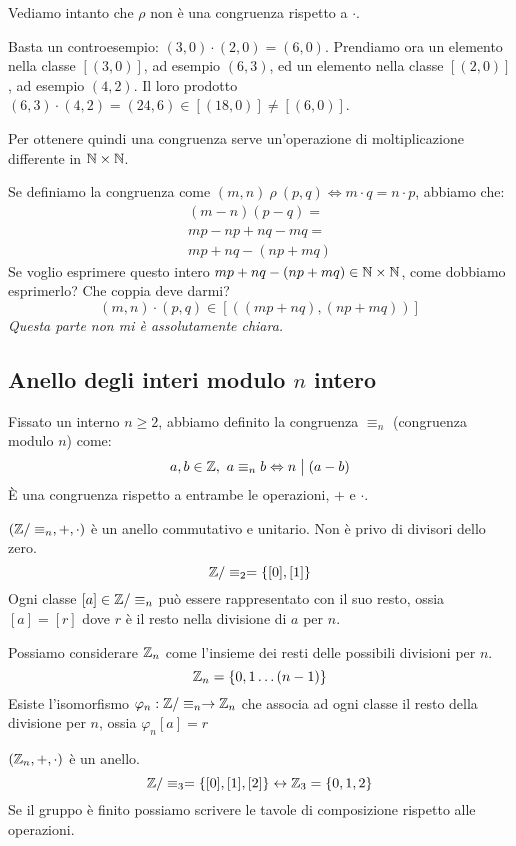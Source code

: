 Vediamo intanto che $\rho$ non \`e una congruenza rispetto a $\cdot$.

Basta un controesempio: $(3, 0) \cdot (2, 0) = (6, 0)$. Prendiamo ora un elemento nella classe $[(3,0)]$, ad esempio $(6,3)$, ed un elemento nella classe $[(2,0)]$, ad esempio $(4,2)$. Il loro prodotto $(6,3) \cdot (4,2) = (24,6) \in [(18,0)] \neq [(6,0)]$.

Per ottenere quindi una congruenza serve un'operazione di moltiplicazione differente in $\mathbb{N} \times \mathbb{N}$.

Se definiamo la congruenza come $(m, n) \ \rho \ (p, q) \iff m \cdot q = n \cdot p$, abbiamo che:
\begin{align*}
(m - n) (p - q) = \\
m p - n p + n q - m q = \\
m p + n q - (n p + m q)
\end{align*}
Se voglio esprimere questo intero $m p + n q - ( n p + m q) \in \mathbb{N} \times \mathbb{N}$, come dobbiamo esprimerlo? Che coppia deve darmi?
\[
(m, n) \cdot (p, q) \in [((m p + n q), (n p + m q))]
\]
\textit{Questa parte non mi \`e assolutamente chiara.}

\subsection{Anello degli interi modulo $n$ intero}

Fissato un interno $n \ge 2$, abbiamo definito la congruenza $\equiv_n$ (congruenza modulo $n$) come:
\[
a, b \in \mathbb{Z} , \ a \equiv_n b \Leftrightarrow n \bigm| (a - b)
\]
\`E una congruenza rispetto a entrambe le operazioni, + e $\cdot$.

$(\mathbb{Z} / \equiv_n, +, \cdot)$ \`e un anello commutativo e unitario. Non \`e privo di divisori dello zero.
\[
\mathbb{Z} / \equiv_2 = \{ [0], [1] \}
\]
Ogni classe $[a] \in \mathbb{Z} / \equiv_n$ pu\`o essere rappresentato con il suo resto, ossia $[a] = [r]$ dove $r$ \`e il resto nella divisione di $a$ per $n$.

Possiamo considerare $\mathbb{Z}_n$ come l'insieme dei resti delle possibili divisioni per $n$.
\[
\mathbb{Z}_n = \{ 0, 1 \dots (n-1)\}
\]
Esiste l'isomorfismo $\varphi_n : \mathbb{Z} / \equiv_n \to \mathbb{Z}_n$ che associa ad ogni classe il resto della divisione per $n$, ossia $\varphi_n [a] = r$

$(\mathbb{Z}_n, +, \cdot )$ \`e un anello.
\[
\mathbb{Z} / \equiv_3 = \{ [0], [1], [2] \} \leftrightarrow \mathbb{Z}_3 = \{ 0, 1, 2 \}
\]
Se il gruppo \`e finito possiamo scrivere le tavole di composizione rispetto alle operazioni.

